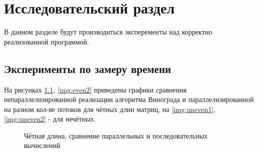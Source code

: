 \chapter{Исследовательский раздел}
\label{cha:research}

В данном разделе будут производиться эксперементы над корректно реализованной программой.

\section{Эксперименты по замеру времени}

На рисунках \ref{img:even1}, \ref{img:even2} приведены графики сравнения непараллелизированной реализации алгоритма Винограда и параллелизированной на разном кол-ве потоков для чётных длин матриц, на \ref{img:uneven1}, \ref{img:uneven2} - для нечётных.

\begin{figure}[H]
    \centering
    \caption{Чётная длина, сравнение параллельных и последовательных вычислений}
    \label{img:even1}
\end{figure}

